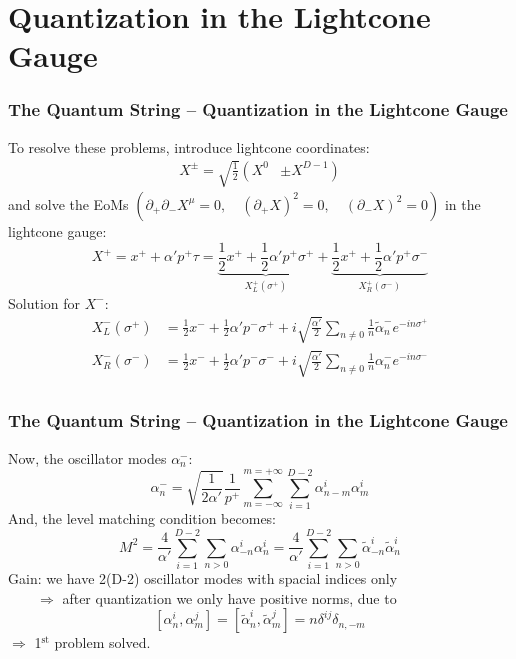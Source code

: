 \documentclass[aspectratio=169]{beamer}
\begin{document}
	\section{Quantization in the Lightcone Gauge}
	
	\begin{frame}
		\frametitle{The Quantum String -- Quantization in the Lightcone Gauge}
		To resolve these problems, introduce lightcone coordinates:
		\begin{align*}
			X^\pm = \sqrt{\frac{1}{2}} \left(X^0\right.&\left.\pm X^{D-1}\right)
		\end{align*}
		and solve the EoMs $\left(\partial_+\partial_-X^\mu = 0, \quad (\partial_+X)^2 = 0, \quad (\partial_-X)^2 = 0 \right)$  in the lightcone gauge: 
		\begin{equation*}
			X^+ = x^+ + \alpha'p^+ \tau = \underbrace{\frac{1}{2}x^+ + \frac{1}{2} \alpha' p^+ \sigma^+}_{X^+_L(\sigma^+)} + \underbrace{\frac{1}{2}x^+ + \frac{1}{2} \alpha' p^+ \sigma^-}_{X^+_R(\sigma^-)}
		\end{equation*}
		Solution for $X^-$:
		\begin{align*}
			X^-_L(\sigma^+) &= \frac{1}{2}x^- + \frac{1}{2} \alpha' p^- \sigma^+ + i \sqrt{\frac{\alpha'}{2}} \sum_{n\neq 0} \frac{1}{n}\tilde{\alpha}^-_n e^{-in\sigma^+}\\
			X^-_R(\sigma^-) &= \frac{1}{2}x^- + \frac{1}{2} \alpha' p^-\sigma^- + i \sqrt{\frac{\alpha'}{2}} \sum_{n\neq 0} \frac{1}{n}\alpha^-_n e^{-in\sigma^-} \\
		\end{align*}
	\end{frame}

	\begin{frame}
		\frametitle{The Quantum String -- Quantization in the Lightcone Gauge}
		Now, the oscillator modes $\alpha^-_n$:
		\begin{equation*}
			\alpha_n^- = \sqrt{\frac{1}{2\alpha'}} \frac{1}{p^+} \sum_{m=-\infty}^{m=+\infty}\sum_{i=1}^{D-2}\alpha^i_{n-m}\alpha^i_m
		\end{equation*}
		And, the level matching condition becomes:
		\begin{equation*}
			M^2 = \frac{4}{\alpha'} \sum_{i=1}^{D-2}\sum_{n>0}^{}\alpha^i_{-n}\alpha^i_n = \frac{4}{\alpha'} \sum_{i=1}^{D-2}\sum_{n>0}^{}\tilde{\alpha}^i_{-n}\tilde{\alpha}^i_n 
		\end{equation*}
		Gain: we have 2(D-2) oscillator modes with spacial indices only\\
		$\qquad \Rightarrow$ after quantization we only have positive norms, due to
		\begin{equation*}
			\left[\alpha^i_n,\alpha^j_m\right]=\left[\tilde\alpha^i_n,\tilde\alpha^j_m\right] = n\delta^{ij}\delta_{n,-m}
		\end{equation*}
		$\Rightarrow$ 1$^{\text{st}}$ problem solved.
	\end{frame}
\end{document}
